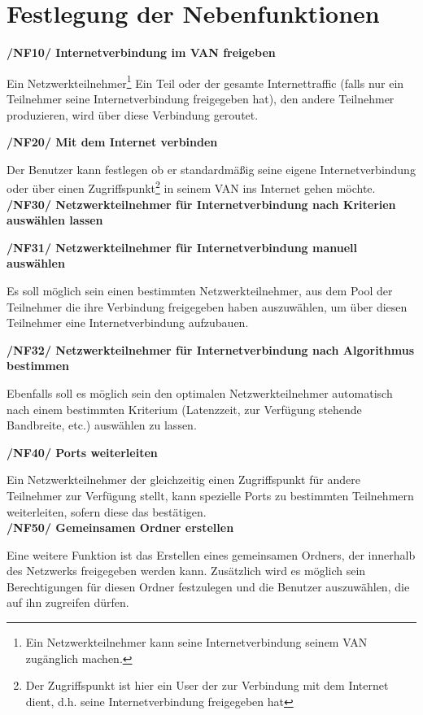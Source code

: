 \documentclass[a4paper,12pt]{scrreprt}
\begin{document}
		\section{Festlegung der Nebenfunktionen}
		\textbf { /NF10/ Internetverbindung im VAN freigeben} 
				
				Ein Netzwerkteilnehmer\footnote{Ein Netzwerkteilnehmer kann seine Internetverbindung seinem VAN zugänglich machen.} Ein Teil oder der gesamte Internettraffic (falls nur ein Teilnehmer seine Internetverbindung freigegeben hat), den andere Teilnehmer produzieren, wird über diese Verbindung geroutet.
				
		\textbf {/NF20/ Mit dem Internet verbinden} 
				
		Der Benutzer kann festlegen ob er standardmäßig seine eigene Internetverbindung oder über einen Zugriffspunkt\footnote{Der Zugriffspunkt ist hier ein User der zur Verbindung mit dem Internet dient, d.h. seine Internetverbindung freigegeben hat} in seinem VAN ins Internet gehen möchte.
		\textbf {/NF30/ Netzwerkteilnehmer für Internetverbindung nach Kriterien auswählen lassen}
		
		
	   	\textbf {/NF31/ Netzwerkteilnehmer für Internetverbindung manuell auswählen}
		
		Es soll möglich sein einen bestimmten Netzwerkteilnehmer, aus dem Pool der Teilnehmer die ihre Verbindung freigegeben haben auszuwählen, um über diesen Teilnehmer eine Internetverbindung aufzubauen.
		
		\textbf {/NF32/ Netzwerkteilnehmer für Internetverbindung nach Algorithmus bestimmen}
		
		Ebenfalls soll es möglich sein den optimalen Netzwerkteilnehmer automatisch nach einem bestimmten Kriterium (Latenzzeit, zur Verfügung stehende Bandbreite, etc.) auswählen zu lassen.
		
		\textbf {/NF40/ Ports weiterleiten}
		
		Ein Netzwerkteilnehmer der gleichzeitig einen Zugriffspunkt für andere Teilnehmer zur Verfügung stellt, kann spezielle Ports zu bestimmten Teilnehmern weiterleiten, sofern diese das bestätigen.\\
		
		\textbf {/NF50/ Gemeinsamen Ordner erstellen}
		
		Eine weitere Funktion ist das Erstellen eines gemeinsamen Ordners, der innerhalb des Netzwerks freigegeben werden kann. Zusätzlich wird es möglich sein Berechtigungen für diesen Ordner festzulegen und die Benutzer auszuwählen, die auf ihn zugreifen dürfen.
		
\end{document}
